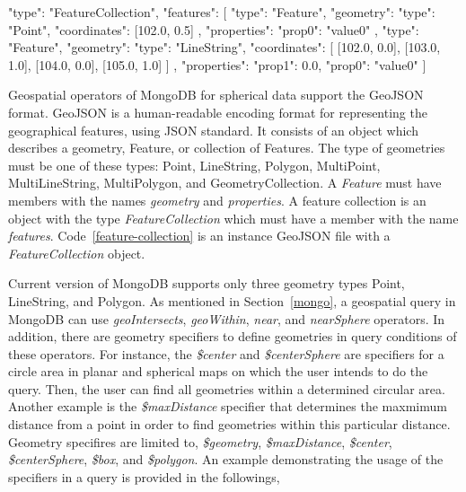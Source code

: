 \documentclass[a4paper,12pt]{article}
\begin{document}
\vspace{10px}
\begin{fakeXML}[label=feature-collection,caption=A GeoJSON file containing a FeatureCollection object]
{
  "type": "FeatureCollection",
  "features": [
    {
      "type": "Feature",
      "geometry": {
        "type": "Point",
        "coordinates": [102.0, 0.5]
      },
      "properties": {
        "prop0": "value0"
      }
    },
    {
      "type": "Feature",
      "geometry": {
        "type": "LineString",
        "coordinates": [
          [102.0, 0.0], [103.0, 1.0], [104.0, 0.0], [105.0, 1.0]
        ]
      },
      "properties": {
        "prop1": 0.0,
        "prop0": "value0"
      }
    }
  ]
}
\end{fakeXML}
\vspace{10px}


Geospatial operators of MongoDB for spherical data support the GeoJSON~\cite{www/geojson} format. GeoJSON is a human-readable encoding format for representing the geographical features, using JSON standard. It consists of an object which describes a geometry, Feature, or collection of Features. The type of geometries must be one of these types: Point, LineString, Polygon, MultiPoint, MultiLineString, MultiPolygon, and GeometryCollection. A \textit{Feature} must have members with the names \textit{geometry} and \textit{properties}. A feature collection is an object with the type \textit{FeatureCollection} which must have a member with the name \textit{features}. Code~\ref{feature-collection} is an instance GeoJSON file with a \textit{FeatureCollection} object.

Current version of MongoDB supports only three geometry types Point, LineString, and Polygon. As mentioned in Section~\ref{mongo}, a geospatial query in MongoDB can use \textit{geoIntersects}, \textit{geoWithin}, \textit{near}, and \textit{nearSphere} operators. In addition, there are geometry specifiers to define geometries in query conditions of these operators. For instance, the \textit{\$center} and \textit{\$centerSphere} are specifiers for a circle area in planar and spherical maps on which the user intends to do the query. Then, the user can find all geometries within a determined circular area. Another example is the \textit{\$maxDistance} specifier that determines the maxmimum distance from a point in order to find geometries within this particular distance. Geometry specifires are limited to, \textit{\$geometry}, \textit{\$maxDistance}, \textit{\$center}, \textit{\$centerSphere}, \textit{\$box}, and \textit{\$polygon}. An example demonstrating the usage of the specifiers in a query is provided in the followings,
\vspace{10px}
 \vspace{10px}
 
\end{document}
